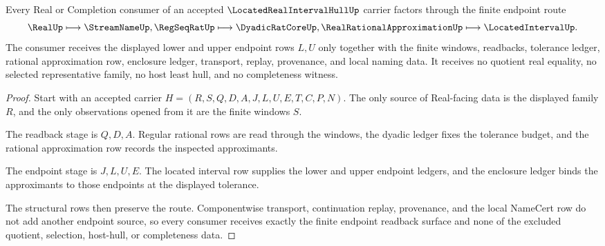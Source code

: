 \begin{theorem}
\label{thm:located-real-interval-hull-finite-endpoint-readback}
Every Real or Completion consumer of an accepted $\LocatedRealIntervalHullUp$ carrier factors through the finite endpoint route
$$
\RealUp \longmapsto \StreamNameUp,\RegSeqRatUp \longmapsto \DyadicRatCoreUp,\RealRationalApproximationUp \longmapsto \LocatedIntervalUp .
$$
The consumer receives the displayed lower and upper endpoint rows $L,U$ only together with the finite windows, readbacks, tolerance ledger, rational approximation row, enclosure ledger, transport, replay, provenance, and local naming data. It receives no quotient real equality, no selected representative family, no host least hull, and no completeness witness.
\end{theorem}
\begin{proof}
Start with an accepted carrier $H=(R,S,Q,D,A,J,L,U,E,T,C,P,N)$. The only source of Real-facing data is the displayed family $R$, and the only observations opened from it are the finite windows $S$.

The readback stage is $Q,D,A$. Regular rational rows are read through the windows, the dyadic ledger fixes the tolerance budget, and the rational approximation row records the inspected approximants.

The endpoint stage is $J,L,U,E$. The located interval row supplies the lower and upper endpoint ledgers, and the enclosure ledger binds the approximants to those endpoints at the displayed tolerance.

The structural rows then preserve the route. Componentwise transport, continuation replay, provenance, and the local NameCert row do not add another endpoint source, so every consumer receives exactly the finite endpoint readback surface and none of the excluded quotient, selection, host-hull, or completeness data.
\end{proof}


